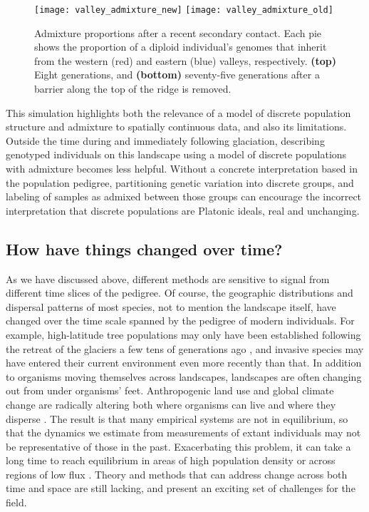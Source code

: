 \documentclass{ar-1col}
\begin{document}
\begin{figure}	%
    \centering
        \texttt{[image: valley\_admixture\_new]}
        \texttt{[image: valley\_admixture\_old]}
        \caption{
            Admixture proportions after a recent secondary contact.
            Each pie shows the proportion of a diploid individual's genomes
            that inherit from the western (red) and eastern (blue) valleys, respectively.
            \textbf{(top)} Eight generations, and
            \textbf{(bottom)} seventy-five generations 
            after a barrier along the top of the ridge is removed.
        }
        \label{postglacial_expansion}
\end{figure}

This simulation highlights both the relevance of 
a model of discrete population structure and admixture
to spatially continuous data, 
and also its limitations.
Outside the time during and immediately following glaciation, 
describing genotyped individuals on this landscape 
using a model of discrete populations with admixture 
becomes less helpful.
Without a concrete interpretation based in the population pedigree,
partitioning genetic variation into discrete groups, 
and labeling of samples as admixed between those groups
can encourage the incorrect interpretation that discrete populations are Platonic ideals,
real and unchanging.

\subsection{How have things changed over time?}

As we have discussed above,
different methods are sensitive to signal
from different time slices of the pedigree.
Of course, the geographic distributions and dispersal patterns of most species,
not to mention the landscape itself,
have changed over the time scale spanned by the pedigree of modern individuals.
For example, 
high-latitude tree populations may only have been established
following the retreat of the glaciers
a few tens of generations ago \citep{WhitlockMcCauley1999},
and invasive species may have entered their current
environment even more recently than that.
In addition to organisms moving themselves across landscapes,
landscapes are often changing out from under organisms' feet.
Anthropogenic land use
and global climate change
are radically altering both where organisms can live
and where they disperse \citep{parmesan1999}.
The result is that many empirical systems
are not in equilibrium,
so that the dynamics we estimate from
measurements of extant individuals may
not be representative of those in the past.
Exacerbating this problem,
it can take a long time to reach equilibrium
in areas of high population density
or across regions of low flux
\citep{CrowAoki1984group, whitlock1992temporal, slatkin1993isolation, WhitlockMcCauley1999}.
Theory and methods that can address change across both time and space
are still lacking,
and present an exciting set of challenges for the field.
\end{document}
